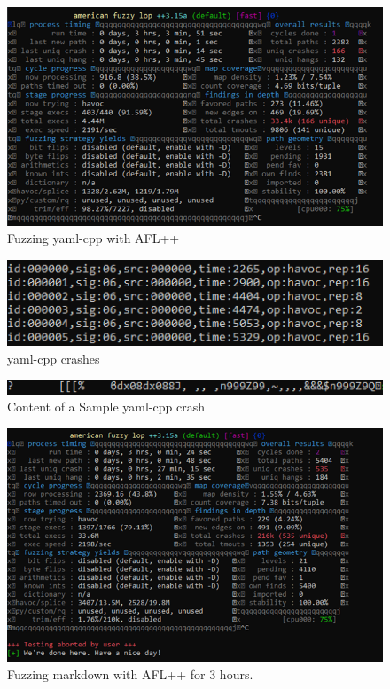 \documentclass[12pt]{diazessay}
\begin{document}
\begin{figure}
	\centering
	\includegraphics[scale=1.0, trim={0 3cm 0 0}, clip]{yamlfuzzer.png}
	\caption{Fuzzing yaml-cpp with AFL++}
\end{figure}

\begin{figure}
	\centering
	\includegraphics[scale=1.0, trim={0 3cm 0 0}, clip]{yaml-sample-crashes.png}
	\caption{yaml-cpp crashes}
\end{figure}

\begin{figure}
	\centering
	\includegraphics[scale=1.0, trim={0 3cm 0 0}, clip]{yamlsamplecrashcat.png}
	\caption{Content of a Sample yaml-cpp crash}
\end{figure}

\begin{figure}
	\centering
	\includegraphics[scale=1.0, trim={0 3cm 0 0}, clip]{markdownfuzzer.png}
	\caption{Fuzzing markdown with AFL++ for 3 hours.}
\end{figure}
\end{document}
